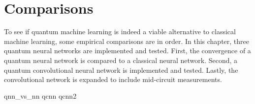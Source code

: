 \chapter{Comparisons}
\label{chap:comparison}

To see if quantum machine learning is indeed a viable alternative to classical machine learning, some empirical comparisons are in order.
In this chapter, three quantum neural networks are implemented and tested.
First, the convergence of a quantum neural network is compared to a classical neural network.
Second, a quantum convolutional neural network is implemented and tested.
Lastly, the convolutional network is expanded to include mid-circuit measurements.

{qnn_vs_nn}
{qcnn}
{qcnn2}